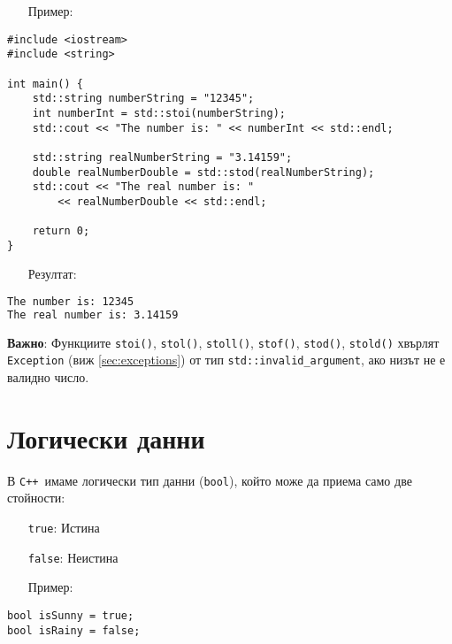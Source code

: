 \documentclass[oneside]{book}
\newcommand*{\code}[1]{\texttt{#1}}
\newcommand*{\cpp}{\texttt{C++}\ }
\begin{document}
\begin{itemize}\item[Пример:]\end{itemize}
\begin{mdframed}\begin{lstlisting}
#include <iostream>
#include <string>

int main() {
    std::string numberString = "12345";
    int numberInt = std::stoi(numberString);
    std::cout << "The number is: " << numberInt << std::endl;

    std::string realNumberString = "3.14159";
    double realNumberDouble = std::stod(realNumberString);
    std::cout << "The real number is: "
        << realNumberDouble << std::endl;

    return 0;
}
\end{lstlisting}\end{mdframed}

\begin{itemize}\item[Резултат:]\end{itemize}
\begin{mdframed}\begin{lstlisting}[language=bash]
The number is: 12345
The real number is: 3.14159
\end{lstlisting}\end{mdframed}

\textbf{Важно}: Функциите \code{stoi()}, \code{stol()}, \code{stoll()}, \code{stof()}, \code{stod()}, \code{stold()} хвърлят \code{Exception} (виж \ref{sec:exceptions}) от тип \code{std::invalid\_argument}, ако низът не е валидно число.

\section{Логически данни}
В \cpp имаме логически тип данни (\code{bool}), който може да приема само две стойности:

\begin{itemize}
    \item[] \code{true}: Истина
    \item[] \code{false}: Неистина
\end{itemize}
\pagebreak
\begin{itemize}\item[Пример:]\end{itemize}
\begin{mdframed}\begin{lstlisting}
bool isSunny = true;
bool isRainy = false;
\end{lstlisting}\end{mdframed}
\end{document}

